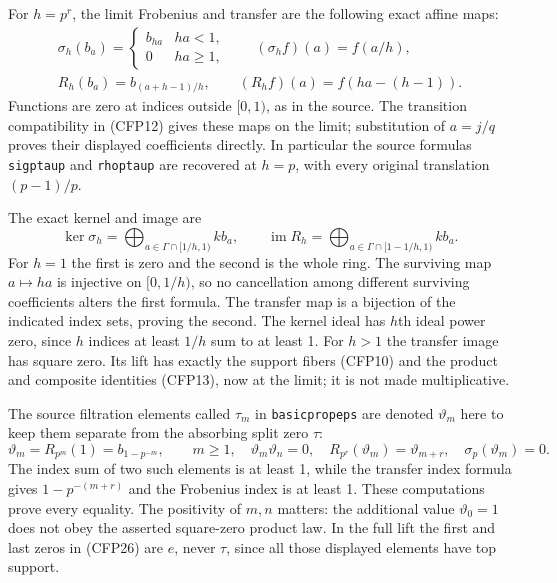 For $h=p^r$, the limit Frobenius and transfer
are the following exact affine maps:
\begin{equation}\tag{CFP24}
\begin{gathered}
 \sigma_h(b_a)=\begin{cases}b_{ha}&ha<1,\\0&ha\ge1,
                       \end{cases}\qquad
 (\sigma_h f)(a)=f(a/h),\\
 R_h(b_a)=b_{(a+h-1)/h},\qquad
 (R_h f)(a)=f(ha-(h-1)).
\end{gathered}
\end{equation}
Functions are zero at indices outside $[0,1)$,
as in the source. The transition compatibility
in (CFP12) gives these maps on the limit;
substitution of $a=j/q$ proves their displayed
coefficients directly. In particular the
source formulas \texttt{sigptaup} and
\texttt{rhoptaup} are recovered at $h=p$,
with every original translation $(p-1)/p$.

The exact kernel and image are
\begin{equation}\tag{CFP25}
 \ker\sigma_h=
       \bigoplus_{a\in\Gamma\cap[1/h,1)}k b_a,
 \qquad
 \operatorname{im}R_h=
       \bigoplus_{a\in\Gamma\cap[1-1/h,1)}k b_a.
\end{equation}
For $h=1$ the first is zero and the second
is the whole ring. The surviving map
$a\mapsto ha$ is injective on $[0,1/h)$,
so no cancellation among different surviving
coefficients alters the first formula.
The transfer map is a bijection of the
indicated index sets, proving the second.
The kernel ideal has $h$th ideal power zero,
since $h$ indices at least $1/h$ sum to
at least 1. For $h>1$ the transfer image
has square zero. Its lift has exactly the
support fibers (CFP10) and the product and
composite identities (CFP13), now at the
limit; it is not made multiplicative.

The source filtration elements called
$\tau_m$ in \texttt{basicpropeps} are denoted
$\vartheta_m$ here to keep them separate
from the absorbing split zero $\tau$:
\begin{equation}\tag{CFP26}
 \vartheta_m=R_{p^m}(1)=b_{1-p^{-m}},\qquad m\ge1,
 \quad
 \vartheta_m\vartheta_n=0,
 \quad R_{p^r}(\vartheta_m)=\vartheta_{m+r},
 \quad \sigma_p(\vartheta_m)=0.
\end{equation}
The index sum of two such elements is at
least 1, while the transfer index formula
gives $1-p^{-(m+r)}$ and the Frobenius
index is at least 1. These computations
prove every equality. The positivity of
$m,n$ matters: the additional value
$\vartheta_0=1$ does not obey the asserted
square-zero product law. In the full lift
the first and last zeros in (CFP26) are
$e$, never $\tau$, since all those
displayed elements have top support.


